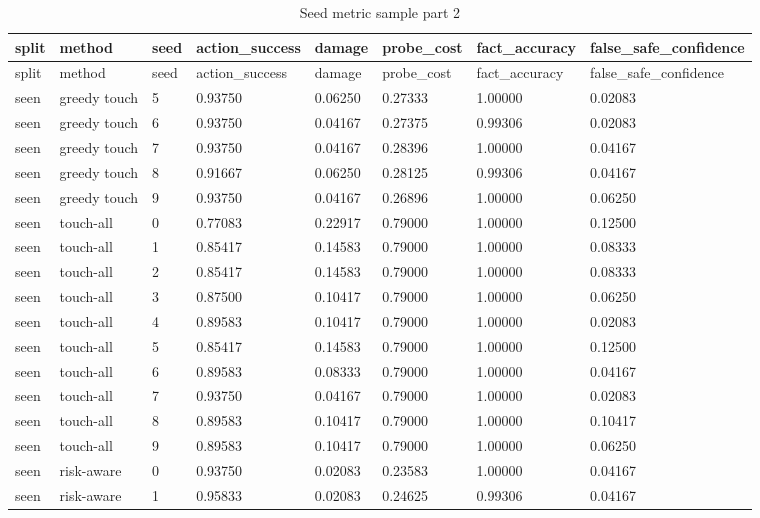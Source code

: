 \documentclass{article}
\begin{document}
\begin{center}
\tiny
\renewcommand{\arraystretch}{0.92}
\setlength{\tabcolsep}{3pt}
\begin{longtable}{llllllll}
\caption{Seed metric sample part 2}\label{tab:seed-metric-sample-2}\\
\toprule
split & method & seed & action\_success & damage & probe\_cost & fact\_accuracy & false\_safe\_confidence \\
\midrule
\endfirsthead
\toprule
split & method & seed & action\_success & damage & probe\_cost & fact\_accuracy & false\_safe\_confidence \\
\midrule
\endhead
seen & greedy touch & 5 & 0.93750 & 0.06250 & 0.27333 & 1.00000 & 0.02083 \\
seen & greedy touch & 6 & 0.93750 & 0.04167 & 0.27375 & 0.99306 & 0.02083 \\
seen & greedy touch & 7 & 0.93750 & 0.04167 & 0.28396 & 1.00000 & 0.04167 \\
seen & greedy touch & 8 & 0.91667 & 0.06250 & 0.28125 & 0.99306 & 0.04167 \\
seen & greedy touch & 9 & 0.93750 & 0.04167 & 0.26896 & 1.00000 & 0.06250 \\
seen & touch-all & 0 & 0.77083 & 0.22917 & 0.79000 & 1.00000 & 0.12500 \\
seen & touch-all & 1 & 0.85417 & 0.14583 & 0.79000 & 1.00000 & 0.08333 \\
seen & touch-all & 2 & 0.85417 & 0.14583 & 0.79000 & 1.00000 & 0.08333 \\
seen & touch-all & 3 & 0.87500 & 0.10417 & 0.79000 & 1.00000 & 0.06250 \\
seen & touch-all & 4 & 0.89583 & 0.10417 & 0.79000 & 1.00000 & 0.02083 \\
seen & touch-all & 5 & 0.85417 & 0.14583 & 0.79000 & 1.00000 & 0.12500 \\
seen & touch-all & 6 & 0.89583 & 0.08333 & 0.79000 & 1.00000 & 0.04167 \\
seen & touch-all & 7 & 0.93750 & 0.04167 & 0.79000 & 1.00000 & 0.02083 \\
seen & touch-all & 8 & 0.89583 & 0.10417 & 0.79000 & 1.00000 & 0.10417 \\
seen & touch-all & 9 & 0.89583 & 0.10417 & 0.79000 & 1.00000 & 0.06250 \\
seen & risk-aware & 0 & 0.93750 & 0.02083 & 0.23583 & 1.00000 & 0.04167 \\
seen & risk-aware & 1 & 0.95833 & 0.02083 & 0.24625 & 0.99306 & 0.04167 \\

\end{longtable}
\end{center}
\end{document}
